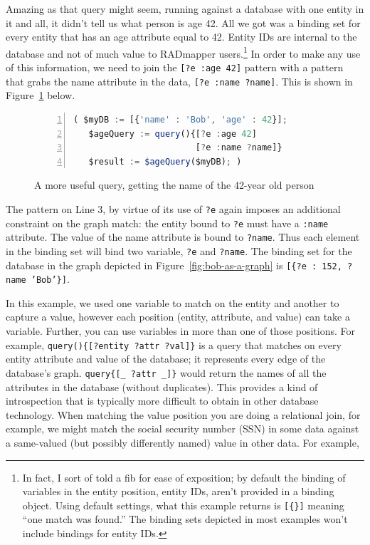 \documentclass[9pt,letterpaper]{article}
\newcommand{\stt}[1]{\texttt{#1}} %
\begin{document}
Amazing as that query might seem, running against a database with one entity in it and all, it didn't tell us what person is age 42.
All we got was a binding set for every entity that has an age attribute equal to 42.
Entity IDs are internal to the database and not of much value to RADmapper users.\footnote{In fact, I sort of told a fib for ease of exposition; by default the binding of variables in the entity position, entity IDs, aren't provided in a binding object.
  Using default settings, what this example returns is \stt{[\{\}]} meaning ``one match was found.''
The binding sets depicted in most examples won't include bindings for entity IDs.}
In order to make any use of this information, we need to join the \stt{[?e :age 42]} pattern with a pattern that grabs the name attribute in the data, \stt{[?e :name ?name]}.
This is shown in Figure~\ref{code:bob-age-more} below.

\begin{figure}[H]
    \caption{A more useful query, getting the name of the 42-year old person}
    \label{code:bob-age-more}
\begin{lstlisting}[language=JavaScript,numberstyle=\scriptsize,basicstyle=\ttfamily\scriptsize,numbers=left,stepnumber=1,breaklines=true]
 ( $myDB := [{'name' : 'Bob', 'age' : 42}];
   $ageQuery := query(){[?e :age 42]
                        [?e :name ?name]}
   $result := $ageQuery($myDB); )
\end{lstlisting}
\end{figure} \vspace{-2em}

The pattern on Line 3, by virtue of its use of \stt{?e} again imposes an additional constraint on the graph match: the entity bound to \stt{?e} must have a \stt{:name} attribute.
The value of the name attribute is bound to \stt{?name}.
Thus each element in the binding set will bind two variable, \stt{?e} and \stt{?name}.
The binding set for the database in the graph depicted in Figure~\ref{fig:bob-as-a-graph} is \stt{[\{?e : 152, ?name 'Bob'\}]}.

In this example, we used one variable to match on the entity and another to capture a value, however each position (entity, attribute, and value) can take a variable.
Further, you can use variables in more than one of those positions.
For example, \stt{query()\{[?entity ?attr ?val]\}} is a query that matches on every entity attribute and value of the database; it represents every edge of the database's graph.
\stt{query\{[\_ ?attr \_]\}} would return the names of all the attributes in the database (without duplicates). %
This provides a kind of introspection that is typically more difficult to obtain in other database technology.
When matching the value position you are doing a relational join, for example, we might match the social security number (SSN) in
some data against a same-valued (but possibly differently named) value in other data.
For example,
\end{document}
